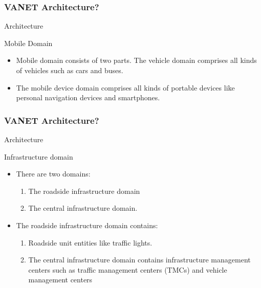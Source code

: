 \documentclass{beamer}
\begin{document}
\begin{frame}
	
	\frametitle{VANET Architecture?}
	\begin{block}{Architecture}
	\begin{block}{Mobile Domain}
		\begin{itemize}
			\item Mobile domain consists of two parts.
			The vehicle domain comprises all kinds of vehicles such as cars and buses.\\ 
			\item The mobile device domain comprises all kinds of portable devices like personal navigation devices and smartphones.
			
			
		\end{itemize}
	\end{block}
\end{block}
	
\end{frame}

\begin{frame}
	
	\frametitle{VANET Architecture?}
	\begin{block}{Architecture}
		\begin{block}{Infrastructure domain}
			\begin{itemize}
				\item There are two domains:\\
				\begin{enumerate}
				\item The roadside infrastructure domain
				\item The central infrastructure domain.
				\end{enumerate}
				 
				\item The roadside infrastructure domain contains:
				\begin{enumerate}
			    \item Roadside unit entities like traffic lights. 
		    	\item The central infrastructure domain contains infrastructure management centers such as traffic management centers (TMCs) and vehicle management centers
				
		     	\end{enumerate}
				
			\end{itemize}
		\end{block}
	\end{block}
	
\end{frame}
\end{document}

